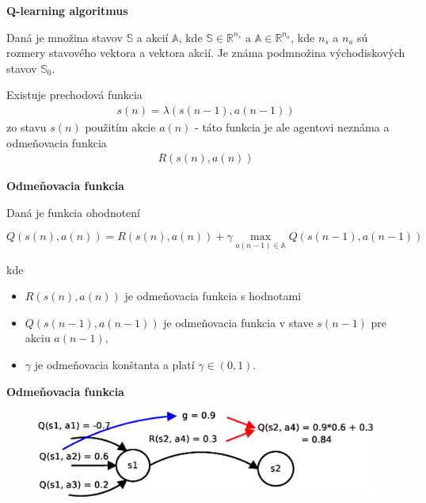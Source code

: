 \documentclass[xcolor=dvipsnames]{beamer}
\begin{document}
\begin{frame}{\bf Q-learning algoritmus}

Daná je množina stavov $\mathbb{S}$ a akcií $\mathbb{A}$, kde
 $\mathbb{S} \in \mathbb{R}^{n_s}$ a $\mathbb{A} \in \mathbb{R}^{n_a}$, kde
$n_s$ a  $n_a$ sú rozmery stavového vektora a vektora akcií. Je známa podmnožina východiskových
stavov $\mathbb{S}_0$.

Existuje prechodová funkcia
\begin{align}
        s(n) = \lambda(s(n-1), a(n-1))
\end{align}
zo stavu $s(n)$ použitím akcie $a(n)$ - táto funkcia je ale agentovi neznáma
a odmeňovacia funkcia
\begin{align}
        R(s(n),a(n))
\end{align}

\end{frame}



\begin{frame}{\bf Odmeňovacia funkcia}

Daná je funkcia ohodnotení

\begin{equation}
Q(s(n),a(n)) = R(s(n),a(n)) + \gamma \max_{a(n-1) \in \mathbb{A}} Q(s(n-1), a(n-1))
\label{eq:q_learning}
\end{equation}


kde \\

\begin{itemize}
 \item $R(s(n),a(n))$ je odmeňovacia funkcia s hodnotami \\
 \item $Q(s(n-1),a(n-1))$ je odmeňovacia funkcia v stave $s(n-1)$ pre akciu $a(n-1)$, \\
 \item $\gamma$ je odmeňovacia konštanta a platí $\gamma \in (0, 1)$.
\end{itemize}

\end{frame}


\begin{frame}{\bf Odmeňovacia funkcia}

\begin{figure}[!htb]
\includegraphics[scale=.4]{../diagrams/q_learning_detail.eps}
\end{figure}


\end{frame}
\end{document}
